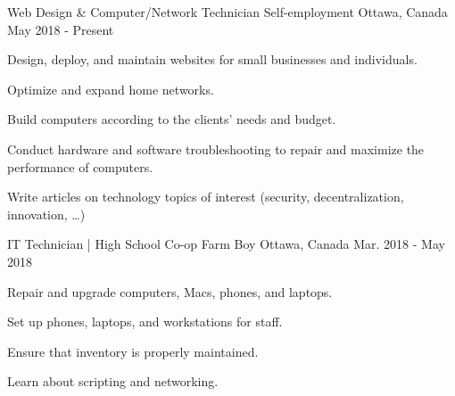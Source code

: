 \begin{cventries}
  \cventry
    {Web Design \& Computer/Network Technician} %
    {Self-employment} %
    {Ottawa, Canada} %
    {May 2018 - Present} %
    {
      \begin{cvitems} %
        \item {Design, deploy, and maintain websites for small businesses and individuals.}
        \item {Optimize and expand home networks.}
        \item {Build computers according to the clients' needs and budget.}
        \item {Conduct hardware and software troubleshooting to repair and maximize the performance of computers.}
        \item {Write articles on technology topics of interest (security, decentralization, innovation, …)}
      \end{cvitems}
    }

  \cventry
    {IT Technician | High School Co-op} %
    {Farm Boy} %
    {Ottawa, Canada} %
    {Mar. 2018 - May 2018} %
    {
      \begin{cvitems} %
        \item {Repair and upgrade computers, Macs, phones, and laptops.}
        \item {Set up phones, laptops, and workstations for staff.}
        \item {Ensure that inventory is properly maintained.}
        \item {Learn about scripting and networking.}
      \end{cvitems}
    }

\end{cventries}
